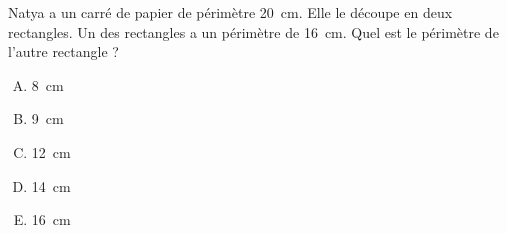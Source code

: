 Natya a un carré de papier de périmètre 20~cm. Elle le découpe en deux rectangles. Un des
rectangles a un périmètre de 16~cm. Quel est le périmètre de l'autre
rectangle ?
\begin{multicols}{5}
  \begin{enumerate}[A)]
  \item 8~cm
  \item 9~cm
  \item 12~cm
  \item 14~cm
  \item 16~cm
  \end{enumerate}
\end{multicols}